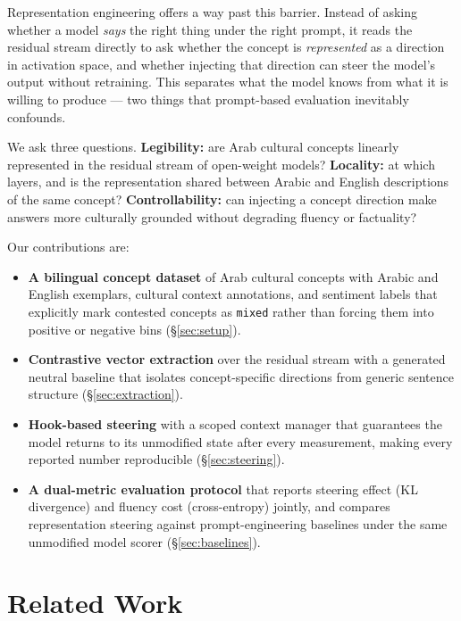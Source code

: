\documentclass[11pt,a4paper]{article}
\begin{document}
Representation engineering \citep{zou2023representation} offers a way past this
barrier. Instead of asking whether a model \emph{says} the right thing under
the right prompt, it reads the residual stream directly to ask whether the
concept is \emph{represented} as a direction in activation space, and whether
injecting that direction can steer the model's output without retraining. This
separates what the model knows from what it is willing to produce --- two
things that prompt-based evaluation inevitably confounds.

We ask three questions. \textbf{Legibility:} are Arab cultural concepts
linearly represented in the residual stream of open-weight models?
\textbf{Locality:} at which layers, and is the representation shared between
Arabic and English descriptions of the same concept? \textbf{Controllability:}
can injecting a concept direction make answers more culturally grounded
without degrading fluency or factuality?

Our contributions are:
\begin{itemize}
  \item \textbf{A bilingual concept dataset} of Arab cultural concepts with
        Arabic and English exemplars, cultural context annotations, and
        sentiment labels that explicitly mark contested concepts as
        \texttt{mixed} rather than forcing them into positive or negative
        bins (\S\ref{sec:setup}).
  \item \textbf{Contrastive vector extraction} over the residual stream with
        a generated neutral baseline that isolates concept-specific directions
        from generic sentence structure (\S\ref{sec:extraction}).
  \item \textbf{Hook-based steering} with a scoped context manager that
        guarantees the model returns to its unmodified state after every
        measurement, making every reported number reproducible
        (\S\ref{sec:steering}).
  \item \textbf{A dual-metric evaluation protocol} that reports steering
        effect (KL divergence) and fluency cost (cross-entropy) jointly, and
        compares representation steering against prompt-engineering baselines
        under the same unmodified model scorer (\S\ref{sec:baselines}).
\end{itemize}

\section{Related Work}
\label{sec:related}
\end{document}
